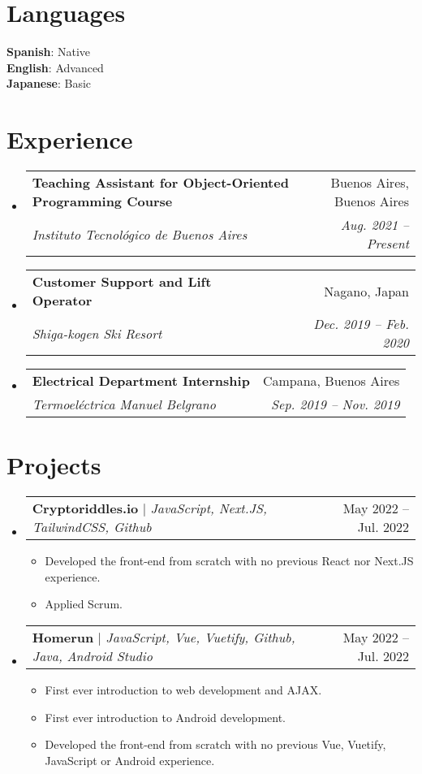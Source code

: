 \documentclass[letterpaper,11pt]{article}
\makeatletter
\newcommand{\resumeItem}[1]{
  \item\small{
    {#1 \vspace{-2pt}}
  }
}
\newcommand{\resumeSubheading}[4]{
  \vspace{-2pt}\item
    \begin{tabular*}{0.97\textwidth}[t]{l@{\extracolsep{\fill}}r}
      \textbf{#1} & #2 \\
      \textit{\small#3} & \textit{\small #4} \\
    \end{tabular*}\vspace{-7pt}
}
\newcommand{\resumeSubSubheading}[2]{
    \item
    \begin{tabular*}{0.97\textwidth}{l@{\extracolsep{\fill}}r}
      \textit{\small#1} & \textit{\small #2} \\
    \end{tabular*}\vspace{-7pt}
}
\newcommand{\resumeProjectHeading}[2]{
    \item
    \begin{tabular*}{0.97\textwidth}{l@{\extracolsep{\fill}}r}
      \small#1 & #2 \\
    \end{tabular*}\vspace{-7pt}
}
\newcommand{\resumeSubHeadingListStart}{\begin{itemize}[leftmargin=0.15in, label={}]}
\newcommand{\resumeSubHeadingListEnd}{\end{itemize}}
\newcommand{\resumeItemListStart}{\begin{itemize}}
\newcommand{\resumeItemListEnd}{\end{itemize}\vspace{-5pt}}
\makeatother
\begin{document}
\section{Languages}
 \begin{itemize}[leftmargin=0.15in, label={}]
    \small{\item{
     \textbf{Spanish}{: Native} \\
     \textbf{English}{: Advanced} \\
     \textbf{Japanese}{: Basic}
    }}
 \end{itemize}


\section{Experience}
  \resumeSubHeadingListStart
  \resumeSubheading
  {Teaching Assistant for Object-Oriented Programming Course}{Buenos Aires, Buenos Aires}
  {Instituto Tecnológico de Buenos Aires}{Aug. 2021 -- Present}
  \resumeSubheading
  {Customer Support and Lift Operator}{Nagano, Japan}
  {Shiga-kogen Ski Resort}{Dec. 2019 -- Feb. 2020}
    \resumeSubheading
    {Electrical Department Internship}{Campana, Buenos Aires}
      {Termoeléctrica Manuel Belgrano}{Sep. 2019 -- Nov. 2019}


   

  \resumeSubHeadingListEnd


\section{Projects}
    \resumeSubHeadingListStart
      \resumeProjectHeading
          {\textbf{Cryptoriddles.io} $|$ \emph{JavaScript, Next.JS, TailwindCSS, Github}}{May 2022 -- Jul. 2022}
          \resumeItemListStart
            \resumeItem{Developed the front-end from scratch with no previous React nor Next.JS experience.}
            \resumeItem{Applied Scrum.}
          \resumeItemListEnd
      \resumeProjectHeading
          {\textbf{Homerun} $|$ \emph{JavaScript, Vue, Vuetify, Github, Java, Android Studio}}{May 2022 -- Jul. 2022}
          \resumeItemListStart
          \resumeItem{First ever introduction to web development and AJAX.}
          \resumeItem{First ever introduction to Android development.}
            \resumeItem{Developed the front-end from scratch with no previous Vue, Vuetify, JavaScript or Android experience.}
          \resumeItemListEnd
    \resumeSubHeadingListEnd
\end{document}
